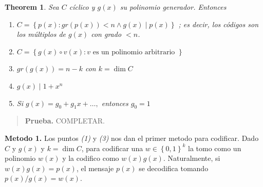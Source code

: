 \documentclass[a4paper]{article}
\newtheorem{theorem}{Theorem}
\newtheorem{theorem}{Theorem}
\begin{document}
\begin{theorem}
    Sea $C$ cíclico y $g(x)$ su polinomio generador. Entonces 

    \begin{enumerate}
        \item $C = \left\{ p(x) : gr\left( p(x) \right) < n \land  g(x) \mid p(x)  \right\} $ ; es decir, 
            los códigos son los múltiplos de $g(x)$ con grado $<n$. 
        \item $C = \left\{ g(x) \circ v(x) : v \text{ es un polinomio arbitrario } \right\} $
        \item $gr\left( g(x) \right) = n - k$ con $k = \dim C$ 
        \item $g(x) \mid 1 + x^n$ 
        \item Si $g(x) = g_0 + g_1x + \ldots, $ entonces $g_0 = 1$
    \end{enumerate}
\end{theorem}


\small
\begin{quote}

\textbf{Prueba.} COMPLETAR.

\end{quote}
\normalsize

\textbf{Metodo 1.} Los puntos \textit{(1)} y \textit{(3)} nos dan el primer
metodo para codificar. Dado $C$ y $g(x)$ y $k = \dim C$, para codificar 
una $w \in \left\{ 0, 1 \right\}^k $ la tomo como un polinomio $w(x)$
y la codifico como $w(x) g(x)$. Naturalmente, si $w(x)g(x) = p(x)$,
el mensaje $p(x)$ se decodifica tomando $p(x) / g(x) = w(x)$.
\end{document}
